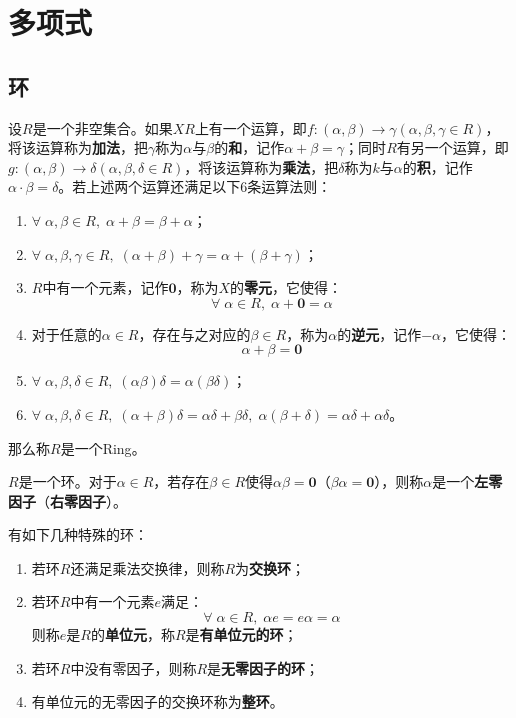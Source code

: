 \section{多项式}

\subsection{环}
\begin{definition}
	设$R$是一个非空集合。如果$XR$上有一个运算，即$f:(\alpha,\beta)\rightarrow\gamma(\alpha,\beta,\gamma\in R)$，将该运算称为\textbf{加法}，把$\gamma$称为$\alpha$与$\beta$的\textbf{和}，记作$\alpha+\beta=\gamma$；同时$R$有另一个运算，即$g:(\alpha,\beta)\rightarrow\delta(\alpha,\beta,\delta\in R)$，将该运算称为\textbf{乘法}，把$\delta$称为$k$与$\alpha$的\textbf{积}，记作$\alpha\cdot\beta=\delta$。若上述两个运算还满足以下$6$条运算法则：
	\begin{enumerate}
		\item $\forall\;\alpha,\beta\in R,\;\alpha+\beta=\beta+\alpha$；
		\item $\forall\;\alpha,\beta,\gamma\in R,\;(\alpha+\beta)+\gamma=\alpha+(\beta+\gamma)$；
		\item $R$中有一个元素，记作$\mathbf{0}$，称为$X$的\textbf{零元}，它使得：
		\begin{equation*}
			\forall\;\alpha\in R,\;\alpha+\mathbf{0}=\alpha
		\end{equation*}
		\item 对于任意的$\alpha\in R$，存在与之对应的$\beta\in R$，称为$\alpha$的\textbf{逆元}，记作$-\alpha$，它使得：
		\begin{equation*}
			\alpha+\beta=\mathbf{0}
		\end{equation*}
		\item $\forall\;\alpha,\beta,\delta\in R,\;(\alpha\beta)\delta=\alpha(\beta\delta)$；
		\item $\forall\;\alpha,\beta,\delta\in R,\;(\alpha+\beta)\delta=\alpha\delta+\beta\delta,\;\alpha(\beta+\delta)=\alpha\delta+\alpha\delta$。
	\end{enumerate}
	那么称$R$是一个\gls{Ring}。
\end{definition}
\begin{definition}
	$R$是一个环。对于$\alpha\in R$，若存在$\beta\in R$使得$\alpha\beta=\mathbf{0}$（$\beta\alpha=\mathbf{0}$），则称$\alpha$是一个\textbf{左零因子}（\textbf{右零因子}）。
\end{definition}
\begin{definition}
	有如下几种特殊的环：
	\begin{enumerate}
		\item 若环$R$还满足乘法交换律，则称$R$为\textbf{交换环}；
		\item 若环$R$中有一个元素$e$满足：
		\begin{equation*}
			\forall\;\alpha\in R,\;\alpha e=e\alpha=\alpha
		\end{equation*}
		则称$e$是$R$的\textbf{单位元}，称$R$是\textbf{有单位元的环}；
		\item 若环$R$中没有零因子，则称$R$是\textbf{无零因子的环}；
		\item 有单位元的无零因子的交换环称为\textbf{整环}。
	\end{enumerate}
\end{definition}
